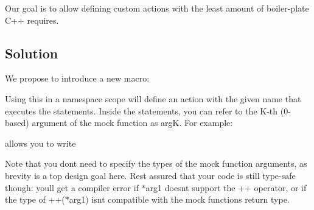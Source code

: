 \begin{DoxyCode}{0}
\DoxyCodeLine{ \textcolor{keyword}{public}:}
\DoxyCodeLine{  \}}
\DoxyCodeLine{\};}
\DoxyCodeLine{}
\DoxyCodeLine{\}}
\DoxyCodeLine{}
\end{DoxyCode}


Our goal is to allow defining custom actions with the least amount of boiler-\/plate C++ requires.

\subsection*{Solution}

We propose to introduce a new macro\+: 
\begin{DoxyCode}{0}
\end{DoxyCode}


Using this in a namespace scope will define an action with the given name that executes the statements. Inside the statements, you can refer to the K-\/th (0-\/based) argument of the mock function as {\ttfamily argK}. For example\+: 
\begin{DoxyCode}{0}
\end{DoxyCode}
 allows you to write 
\begin{DoxyCode}{0}
\end{DoxyCode}


Note that you don\textquotesingle{}t need to specify the types of the mock function arguments, as brevity is a top design goal here. Rest assured that your code is still type-\/safe though\+: you\textquotesingle{}ll get a compiler error if {\ttfamily $\ast$arg1} doesn\textquotesingle{}t support the {\ttfamily ++} operator, or if the type of {\ttfamily ++($\ast$arg1)} isn\textquotesingle{}t compatible with the mock function\textquotesingle{}s return type.

